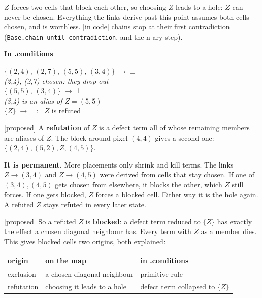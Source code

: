 \documentclass[10pt,a4paper]{article}
\newcommand{\incode}{\textsf{\scriptsize\color{okc}[in code]}}
\newcommand{\proposed}{\textsf{\scriptsize\color{candc}[proposed]}}
\newcommand{\interms}{\par\medskip\textsf{\small\bfseries\color{inksoft}In .conditions}\par}
\newcommand{\code}[1]{\texttt{#1}}
\newcommand{\T}[1]{\ensuremath{\{#1\}}}
\newenvironment{algebra}{\begin{center}\begin{minipage}{0.92\linewidth}\small\setlength{\parskip}{0.2em}}{\end{minipage}\end{center}}
\newcommand{\cmt}[1]{{\color{inksoft}\textit{#1}}}
\begin{document}
$Z$ forces two cells that block each other, so choosing $Z$ leads to a hole: $Z$ can never be chosen. Everything the links derive past this point assumes both cells chosen, and is worthless. \incode{} chains stop at their first contradiction (\code{Base.chain\_until\_contradiction}, and the n-ary step).

\interms
\begin{algebra}
$\T{(2,4),\,(2,7),\,(5,5),\,(3,4)} \;\longrightarrow\; \bot$\\
\cmt{(2,4), (2,7) chosen: they drop out}\\
$\T{(5,5),\,(3,4)} \;\longrightarrow\; \bot$\\
\cmt{(3,4) is an alias of $Z=(5,5)$}\\
$\T{Z} \;\longrightarrow\; \bot$: \ $Z$ is refuted
\end{algebra}
\proposed{} A \textbf{refutation} of $Z$ is a defect term all of whose remaining members are aliases of $Z$. The block around pixel $(4,4)$ gives a second one: $\T{(2,4),(5,2),Z,(4,5)}$.

\textbf{It is permanent.} More placements only shrink and kill terms. The links $Z\to(3,4)$ and $Z\to(4,5)$ were derived from cells that stay chosen. If one of $(3,4),(4,5)$ gets chosen from elsewhere, it blocks the other, which $Z$ still forces. If one gets blocked, $Z$ forces a blocked cell. Either way it is the hole again. A refuted $Z$ stays refuted in every later state.

\proposed{} So a refuted $Z$ is \textbf{blocked}: a defect term reduced to $\T{Z}$ has exactly the effect a chosen diagonal neighbour has. Every term with $Z$ as a member dies. This gives blocked cells two origins, both explained:
\begin{center}\small
\begin{tabular}{@{}lll@{}}
\toprule
origin & on the map & in .conditions\\
\midrule
exclusion & a chosen diagonal neighbour & primitive rule\\
refutation & choosing it leads to a hole & defect term collapsed to $\T{Z}$\\
\bottomrule
\end{tabular}
\end{center}

\end{document}
